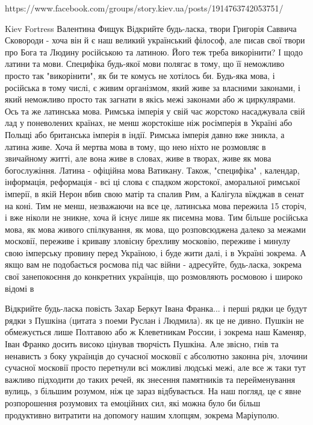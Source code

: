  
 
 
 
 

https://www.facebook.com/groups/story.kiev.ua/posts/1914763742053751/

Kiev Fortress Валентина Фищук Відкрийте будь-ласка, твори Григорія Саввича
Сковороди - хоча він й є наш великий український філософ, але писав свої твори
про Бога та Людину російською та латиною. Його теж треба викорінити? І щодо
латини та мови. Специфіка будь-якої мови полягає в тому, що її неможливо просто
так "викорінити", як би те комусь не хотілось би. Будь-яка мова, і російська в
тому числі, є живим організмом, який живе за власними законами, і який
неможливо просто так загнати в якісь межі законами або ж циркулярами. Ось та же
латинська мова. Римська імперія у свій час жорстоко насаджувала свій лад у
поневолених країнах, не менш жорстокіше ніж росімперія в Україні або Польщі або
британська імперія в індії. Римська імперія давно вже зникла, а латина живе.
Хоча й мертва мова в тому, що нею ніхто не розмовляє в звичайному житті, але
вона живе в словах, живе в творах, живе як мова богослужіння. Латина - офіційна
мова Ватикану. Також, "специфіка" , календар, інформація, реформація - всі ці
слова є спадком жорстокої, аморальної римської імперії, в якій Нерон вбив свою
матір та спалив Рим, а Калігула вїжджав в сенат на коні. Тим не менш,
незважаючи на все це, латинська мова пережила 15 сторіч, і вже ніколи не
зникне, хоча й існує лише як писемна мова. Тим більше російська мова, як мова
живого спілкування, як мова, що розповсюджена далеко за межами московії,
переживе і криваву зловісну брехливу московію, переживе і минулу свою імперську
провину перед Україною, і буде жити далі, і в Україні зокрема. А якщо вам не
подобається росмова під час війни - адресуйте, будь-ласка, зокрема свої
занепокоєння до конкретних українців, що розмовляють росмовою і широко відомі в

Відкрийте будь-ласка повість Захар Беркут Івана Франка... і перші рядки це
будут рядки з Пушкіна (цитата з поеми Руслан і Людмила). як це не дивно. Пушкін
не обмежується лише Полтавою або ж Клеветникам России, і зокрема наш Каменяр,
Іван Франко досить високо цінував творчість Пушкіна. Але звісно, гнів та
ненависть з боку українців до сучасної московії є абсолютно законна річ,
злочини сучасної московії просто перетнули всі можливі людські межі, але все ж
таки тут важливо підходити до таких речей, як знесення памятників та
перейменування вулиць, з більшим розумом, ніж це зараз відбувається. На наш
погляд, це є явне розпорошення розумових та емоційних сил, які можна було би
більш продуктивно витратити на допомогу нашим хлопцям, зокрема Маріуполю.


